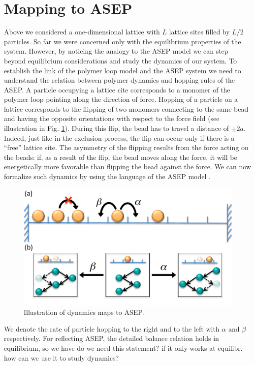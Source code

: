 \documentclass[aps,showpacs,twocolumn,floatfix,prx,superscriptaddress]{revtex4-1}
\begin{document}
\section{Mapping to ASEP}\label{sec:asep}
Above we considered a one-dimensional lattice with $L$ lattice sites filled by $L/2$ particles. So far we were concerned only with the equilibrium properties of the system. However, by noticing the analogy to the ASEP model we can step
beyond equilibrium considerations and study the dynamics of our system. To establish the link of the polymer loop model and the ASEP system we need to understand the relation between polymer dynamics and hopping rules of the ASEP.  A particle occupying a lattice cite corresponds to a monomer of the polymer loop pointing along the direction of force. 
Hopping of a particle on a lattice corresponds to the flipping of two monomers connecting to the same bead and having the opposite orientations with respect to the force field (see illustration in Fig. \ref{fig:asep}). During this flip, the bead has to travel a distance of $\pm2a$. Indeed, just like in the exclusion process, the flip can occur only if there is a ``free'' lattice site. The asymmetry of the flipping results from the force acting on the beads: if, as a result of the flip, the bead moves along the force, it will be energetically more favorable than flipping the bead against the force. We can now formalize such dynamics by using the language of the ASEP model \cite{Derrida1998,Schutz2001}. 
 \begin{figure}[htpb]
     \centering
     \includegraphics[width=1.0\linewidth]{asep}
     \caption{Illustration of dynamics maps to ASEP.}
     \label{fig:asep}
 \end{figure}
We denote the rate of particle hopping to the right and to the left with $\alpha$ and $\beta$ respectively. For reflecting ASEP, the detailed balance relation holds in equilibrium, so we have {\color{red} do we need this statement? if it only works at equilibr. how can we use it to study dynamics?}
\end{document}
